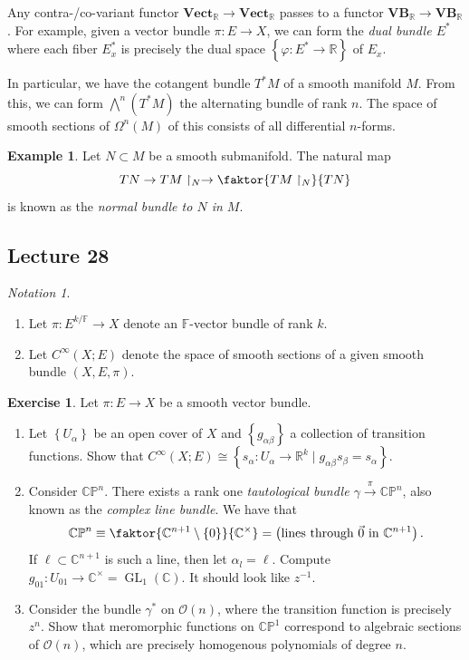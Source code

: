 \documentclass[10pt,letterpaper,cm]{nupset}
\theoremstyle{definition}
\newtheorem{exmp}[definition]{Example}
\theoremstyle{theorem}
\newtheorem{exercise}[definition]{Exercise}
\theoremstyle{remark}
\newtheorem*{notation}{Notation}
\newcommand{\C}{\mathbb C}
\newcommand{\CP}{\mathbb{CP}}
\newcommand{\F}{\mathbb F}
\newcommand{\R}{\mathbb{R}}
\newcommand{\1}{\mathbb{1}}
\newcommand{\0}{\vec 0}
\DeclareMathOperator{\GL}{GL}
\begin{document}
\medskip

Any contra-/co-variant functor $\mathbf{Vect}_{\mathbb{R}} \to \mathbf{Vect}_{\mathbb{R}} $ passes to a functor $\mathbf{VB}_{\R} \to \mathbf{VB}_{\R}$. For example,  given a vector bundle $\pi : E \to X$, we can form the \textit{dual bundle $E^{\ast}$} where each fiber $E^{\ast}_x$ is precisely the dual space $\left\{\varphi : E^{\ast} \to \mathbb{R}\right\}$ of  $E_x$. 

In particular, we have the cotangent bundle $T^{\ast}{M}$ of a smooth manifold $M$. From this, we can form $\bigwedge^{n}(T^{\ast}{M})$ the alternating bundle of rank $n$. The space of smooth sections of $\Omega^n(M)$ of this consists of all differential $n$-forms.

\smallskip

\begin{exmp}
Let $N\subset M$ be a smooth submanifold. The natural map
\[
T{N} \to T{M}\restriction_N \to \faktor{T{M}\restriction_N}{T{N}}
\] is known as the \textit{normal bundle to $N$ in $M$}.
\end{exmp}

\subsection{Lecture 28}

\begin{notation} $ $
\begin{enumerate}
\item Let $\pi : E^{k/\F} \to X$ denote an $\F$-vector bundle of rank $k$. 
\item Let $C^{\infty}(X; E)$ denote the space of smooth sections of a given smooth bundle $\left(X, E, \pi\right)$.
\end{enumerate}
\end{notation}

\begin{exercise} Let $\pi: E \to X$ be a smooth vector bundle.
\begin{enumerate}
\item  Let $\left\{U_{\alpha}\right\}$ be an open cover of $X$ and $\left\{g_{\alpha{\beta}}\right\}$  a collection of transition functions. Show that $C^{\infty}(X; E) \cong \left\{ s_{\alpha} : U_{\alpha} \to \R^k \mid g_{\alpha{\beta}} s_{\beta} = s_{\alpha}\right\}$.
\item Consider $\CP^n$. There exists a rank one \textit{tautological bundle $ \gamma \overset{\pi}{\longrightarrow} \CP^n$}, also known as the \textit{complex line bundle}. We have that $$\CP^n \equiv \faktor{\C^{n+1}\setminus \left\{0\right\}}{\C^{\times}} = \left(\text{lines through }\vec{0} \text{ in }\C^{n+1}\right).$$ If $\ell \subset \C^{n+1}$ is such a line, then let $\alpha_l = \ell$. Compute $g_{01} : U_{01} \to \C^{\times} = \GL_1(\C)$. It should look like $z^{-1}$.
\item Consider the bundle $\gamma^{\ast}$ on $\mathcal{O}(n)$, where the transition function is precisely $z^n$. Show that meromorphic functions on $\CP^1$ correspond to algebraic sections of $\mathcal{O}(n)$, which are precisely homogenous polynomials of degree $n$.
\end{enumerate}
\end{exercise}
\end{document}
